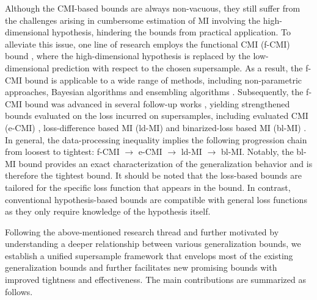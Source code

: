 \documentclass[onecolumn,romanappendices,10pt]{IEEEtran}
\begin{document}
	Although the CMI-based bounds are always non-vacuous, they still suffer from the challenges arising in cumbersome estimation of MI involving the high-dimensional hypothesis, hindering the bounds from practical application. To alleviate this issue, one line of research employs the functional CMI (f-CMI) bound \cite{harutyunyan2021information}, where the high-dimensional hypothesis is replaced by the low-dimensional prediction with respect to the chosen supersample. As a result, the f-CMI bound is applicable to a wide range of methods, including non-parametric approaches, Bayesian algorithms and ensembling algorithms \cite{harutyunyan2021information}. Subsequently, the f-CMI bound was advanced in several follow-up works \cite{hellstrom2022new,wang2023tighter,dongexactly}, yielding strengthened bounds evaluated on the loss incurred on supersamples, including evaluated CMI (e-CMI) \cite{hellstrom2022new}, loss-difference based MI (ld-MI) \cite{wang2023tighter} and binarized-loss based MI (bl-MI) \cite{dongexactly}. In general, the data-processing inequality implies the following progression chain from loosest to tightest: f-CMI $\to$ e-CMI $\to$ ld-MI $\to$ bl-MI. Notably, the bl-MI bound provides an exact characterization of the generalization behavior and is therefore the tightest bound. It should be noted that the loss-based bounds are tailored for the specific loss function that appears in the bound. In contrast, conventional hypothesis-based bounds are compatible with general loss functions as they only require knowledge of the hypothesis itself. 
	
	Following the above-mentioned research thread and further motivated by understanding a deeper relationship between various generalization bounds, we establish a unified supersample framework that envelops most of the existing generalization bounds and further facilitates new promising bounds with improved tightness and effectiveness. The main contributions are summarized as follows.
	
\end{document}
